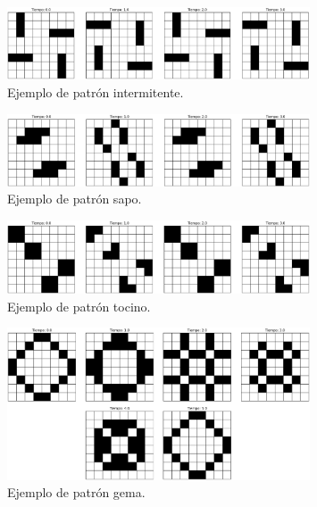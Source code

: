 \documentclass[12pt]{article}
\begin{document}

\begin{figure}
  \centering
  \includegraphics[width=0.8\textwidth]{imagenes/oscilante1.png}
  \caption{Ejemplo de patrón intermitente.\label{img:oscilante1}}
\end{figure}

\begin{figure}
  \centering
  \includegraphics[width=0.8\textwidth]{imagenes/oscilante2.png}
  \caption{Ejemplo de patrón sapo.\label{img:oscilante2}}
\end{figure}

\begin{figure}
  \centering
  \includegraphics[width=0.8\textwidth]{imagenes/oscilante3.png}
  \caption{Ejemplo de patrón tocino.\label{img:oscilante3}}
\end{figure}

\begin{figure}
  \centering
  \includegraphics[width=0.8\textwidth]{imagenes/oscilante4.png}
  \caption{Ejemplo de patrón gema.\label{img:oscilante4}}
\end{figure}
\end{document}
